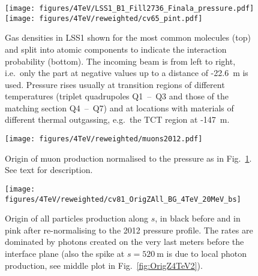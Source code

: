 \begin{figure}%
\begin{center}
  \texttt{[image: figures/4TeV/LSS1\_B1\_Fill2736\_Finala\_pressure.pdf]}
  \texttt{[image: figures/4TeV/reweighted/cv65\_pint.pdf]}
\end{center}
\vspace{-0.6cm}
 \caption{Gas densities in LSS1 shown for the most common molecules (top) and split into atomic components to indicate the interaction probability (bottom). The incoming beam is from left to right, i.e.~only the part at negative values up to a distance of -22.6~m is used. Pressure rises usually at transition regions of different temperatures (triplet quadrupoles Q1~--~Q3 and those of the matching section Q4~--~Q7) and at locations with materials of different thermal outgassing, e.g.~the TCT region at -147~m.
  \label{pressure2012}}
\end{figure}

\begin{figure}%
\begin{center}
  \texttt{[image: figures/4TeV/reweighted/muons2012.pdf]}
\end{center}
\vspace{-0.6cm}
 \caption{Origin of muon production normalised to the pressure as in Fig.~\ref{pressure2012}. See text for description.
  \label{fig:method}}
\end{figure}


\begin{figure}
\begin{center}
  \texttt{[image: figures/4TeV/reweighted/cv81\_OrigZAll\_BG\_4TeV\_20MeV\_bs]}
\end{center}
\vspace{-0.6cm}
 \caption{Origin of all particles production along $s$, in black before and in pink after re-normalising to the 2012 pressure profile. The rates are dominated by photons created on the very last meters before the interface plane (also the spike at $s=520~$m is due to local photon production, see middle plot in Fig.~\ref{fig:OrigZ4TeV2}).
  \label{fig:OrigZ4TeV}}
\end{figure}

